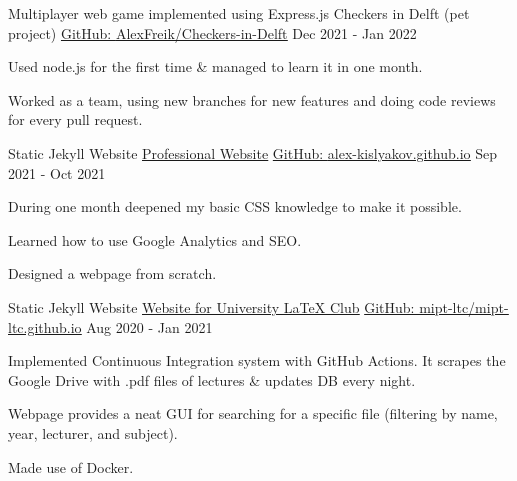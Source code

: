 
\newcommand{\gitHref}[1]{\href{https://github.com/#1}{GitHub: \underline{#1}}}
\newcommand{\myHref}[2]{\href{#1}{\underline{#2}}}

\begin{cventries}

  \cventry
    {Multiplayer web game implemented using Express.js}
    {Checkers in Delft (pet project)} 
    {\gitHref{AlexFreik/Checkers-in-Delft}} %
    {Dec 2021 - Jan 2022} %
    {
      \begin{cvitems} %
        \item {Used node.js for the first time \&
            managed to learn it in one month.}
        \item {Worked as a team, using new branches for new features and doing
            code reviews for every pull request.}
      \end{cvitems}
    }

  \cventry
    {Static Jekyll Website}
    {\href{https://aleksnlp.com/}{\underline{Professional Website}}} 
    {\gitHref{alex-kislyakov.github.io}} %
    {Sep 2021 - Oct 2021} %
    {
      \begin{cvitems} %
        \item {During one month deepened my basic CSS knowledge 
            to make it possible.}
        \item {Learned how to use Google Analytics and SEO.}
        \item {Designed a webpage from scratch.}
      \end{cvitems}
    }
  \cventry
    {Static Jekyll Website}
    {\href{https://mipt-ltc.github.io/}{\underline{Website for University LaTeX Club}}} 
    {\gitHref{mipt-ltc/mipt-ltc.github.io}} %
    {Aug 2020 - Jan 2021} %
    {
      \begin{cvitems} %
      \item {Implemented Continuous Integration system with GitHub Actions. It scrapes the Google Drive with .pdf files of lectures \& updates DB every night.}
        \item {Webpage provides a neat GUI for searching for a 
            specific file (filtering by name, year, lecturer, and subject).}
        \item {Made use of Docker.}
      \end{cvitems}
    }


\end{cventries}
